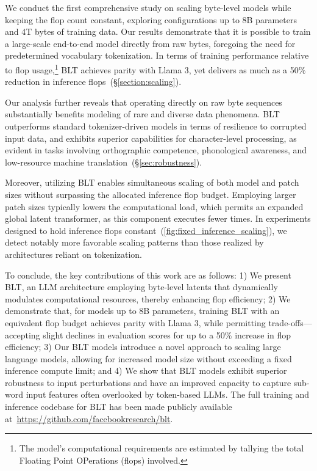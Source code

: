 We conduct the first comprehensive study on scaling byte-level models while keeping the flop count constant, exploring configurations up to 8B parameters and 4T bytes of training data. Our results demonstrate that it is possible to train a large-scale end-to-end model directly from raw bytes, foregoing the need for predetermined vocabulary tokenization. In terms of training performance relative to flop usage,\footnote{The model’s computational requirements are estimated by tallying the total Floating Point OPerations (flops) involved.} {\textsc BLT} achieves parity with Llama 3, yet delivers as much as a 50\% reduction in inference flops~(\S\ref{section:scaling}).

Our analysis further reveals that operating directly on raw byte sequences substantially benefits modeling of rare and diverse data phenomena. {\textsc BLT} outperforms standard tokenizer-driven models in terms of resilience to corrupted input data, and exhibits superior capabilities for character-level processing, as evident in tasks involving orthographic competence, phonological awareness, and low-resource machine translation~(\S\ref{sec:robustness}).

Moreover, utilizing {\textsc BLT} enables simultaneous scaling of both model and patch sizes without surpassing the allocated inference flop budget. Employing larger patch sizes typically lowers the computational load, which permits an expanded global latent transformer, as this component executes fewer times. In experiments designed to hold inference flops constant~(\autoref{fig:fixed_inference_scaling}), we detect notably more favorable scaling patterns than those realized by architectures reliant on tokenization.

To conclude, the key contributions of this work are as follows: 1) We present {\textsc BLT}, an LLM architecture employing byte-level latents that dynamically modulates computational resources, thereby enhancing flop efficiency; 2) We demonstrate that, for models up to 8B parameters, training {\textsc BLT} with an equivalent flop budget achieves parity with Llama 3, while permitting trade-offs—accepting slight declines in evaluation scores for up to a 50\% increase in flop efficiency; 3) Our {\textsc BLT} models introduce a novel approach to scaling large language models, allowing for increased model size without exceeding a fixed inference compute limit; and 4) We show that {\textsc BLT} models exhibit superior robustness to input perturbations and have an improved capacity to capture sub-word input features often overlooked by token-based LLMs. The full training and inference codebase for {\textsc BLT} has been made publicly available at~\url{https://github.com/facebookresearch/blt}.

